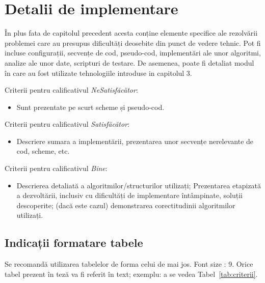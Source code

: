 \documentclass[12pt,a4paper]{report}
\begin{document}
\chapter{Detalii de implementare}
În plus fata de capitolul precedent acesta conține elemente specifice ale rezolvării problemei care au presupus dificultăți deosebite din punct de vedere tehnic. Pot fi incluse configurații, secvențe de cod, pseudo-cod, implementări ale unor algoritmi, analize ale unor date, scripturi de testare. De asemenea, poate fi detaliat modul în care au fost utilizate tehnologiile introduse in capitolul 3.


Criterii pentru calificativul \textit{Ne\textit{Satisfăcător}}:
\begin{itemize}
    \item	Sunt prezentate pe scurt scheme și pseudo-cod.
\end{itemize}
Criterii pentru calificativul \textit{Satisfăcător}:
\begin{itemize}
    \item	Descriere sumara a implementării, prezentarea unor secvențe nerelevante de cod, scheme, etc.
\end{itemize}
Criterii pentru calificativul \textit{Bine}:
\begin{itemize}
    \item	Descrierea detaliată a algoritmilor/structurilor utilizați; Prezentarea etapizată a dezvoltării, inclusiv cu dificultăți de implementare întâmpinate, soluții descoperite; (dacă este cazul) demonstrarea corectitudinii algoritmilor utilizați.
\end{itemize}

\section{Indicații formatare tabele}
Se recomandă utilizarea tabelelor de forma celui de mai jos.  Font size :  9.
Orice tabel prezent în teză va fi referit în text; exemplu: a se vedea Tabel~\ref{tab:criterii}.
\end{document}
